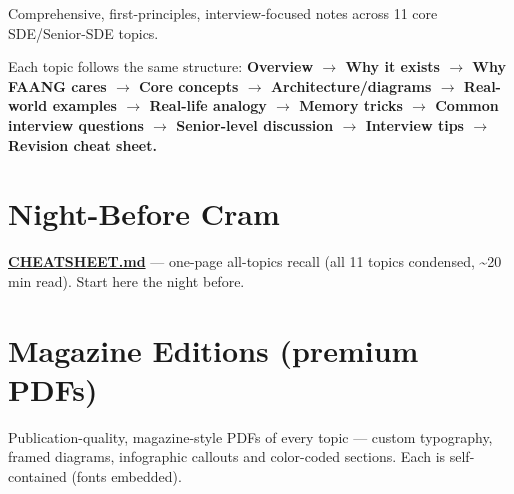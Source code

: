 \documentclass[11pt]{article}
\begin{document}
\makecoverpage

\thispagestyle{empty}
{\hypersetup{hidelinks}\tableofcontents}
\clearpage

Comprehensive, first-principles, interview-focused notes across 11 core SDE/Senior-SDE topics.

Each topic follows the same structure:
\textbf{Overview \(\rightarrow\) Why it exists \(\rightarrow\) Why FAANG cares \(\rightarrow\) Core concepts \(\rightarrow\) Architecture/diagrams \(\rightarrow\) Real-world examples \(\rightarrow\) Real-life analogy \(\rightarrow\) Memory tricks \(\rightarrow\) Common interview questions \(\rightarrow\) Senior-level discussion \(\rightarrow\) Interview tips \(\rightarrow\) Revision cheat sheet.}

\section{Night-Before Cram}\label{night-before-cram}

\textbf{\url{CHEATSHEET.md}} --- one-page all-topics recall (all 11 topics condensed, \textasciitilde20 min read). Start here the night before.

\section{Magazine Editions (premium PDFs)}\label{magazine-editions-premium-pdfs}

Publication-quality, magazine-style PDFs of every topic --- custom typography, framed diagrams, infographic callouts and color-coded sections. Each is self-contained (fonts embedded).
\end{document}
